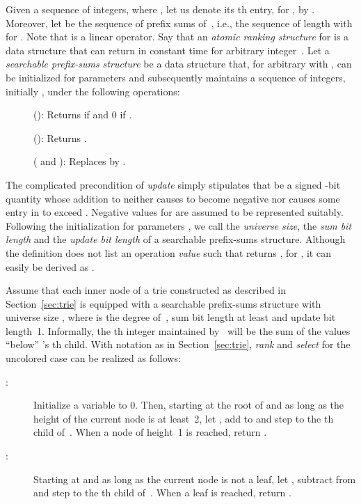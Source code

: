 \documentclass[envcountsame,envcountsect,undated,nolinenumbers]{lnthi}
\def\Tvn#1{\hbox{\textit{#1\/}}}
\begin{document}
Given a sequence  of  integers, where
, let us denote its th entry,
for , by .
Moreover, let  be the
sequence of prefix sums of~, i.e., the
sequence of length  with
 for .
Note that  is a linear operator.
Say that an \emph{atomic ranking structure}
for  is a data structure that can return
 in constant time for
arbitrary integer~.
Let a \emph{searchable prefix-sums structure}
be a data structure that, for arbitrary
 with ,
can be initialized for parameters
 and subsequently
maintains a sequence 
of  integers, initially ,
under the following operations:

\begin{description}
\item[\normalfont]
():
Returns  if  and 0 if .
\item[\normalfont]
():
Returns .
\item[\normalfont]
( and
):
Replaces  by .
\end{description}

\noindent
The complicated precondition of \Tvn{update}
simply stipulates that  be a signed -bit
quantity whose addition to  neither causes
 to become negative nor causes
some entry in 
to exceed .
Negative values for  are assumed
to be represented suitably.
Following the initialization for parameters ,
we call  the \emph{universe size},
 the \emph{sum bit length} and
 the \emph{update bit length} of a searchable
prefix-sums structure.
Although the definition does not list an operation
\Tvn{value} such that  returns ,
for , it can easily be derived as
.

Assume that each inner node  of a trie  constructed
as described in Section~\ref{sec:trie} is equipped
with a searchable prefix-sums structure  with
universe size , where  is the degree of~,
sum bit length at least
 and update bit length~1.
Informally, the th integer maintained by~
will be the sum of the values ``below'' 's
th child.
With notation as in
Section~\ref{sec:trie}, \Tvn{rank} and \Tvn{select}
for the uncolored case
can be realized as follows:

\begin{description}
\item[\normalfont:]
Initialize a variable  to 0.
Then, starting at the root  of  and as long as the
height of the current node  is at least~2,
let ,
add  to  and step
to the th child of~.
When a node  of height~1 is reached,
return .
\item[\normalfont:]
Starting at  and as long as the current node
 is not a leaf,
let ,
subtract  from 
and step to the th child of~.
When a leaf  is reached, return .
\end{description}
\end{document}
